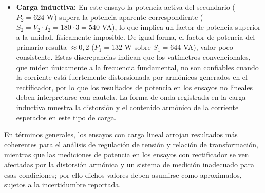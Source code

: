 \begin{itemize}
    \item \textbf{Carga inductiva:} En este ensayo la potencia activa del secundario ($P_2 = 624$ W) supera la potencia aparente correspondiente ($S_2 = V_2 \cdot I_2 = 180 \cdot 3 = 540$ VA), lo que implica un factor de potencia superior a la unidad, físicamente imposible. De igual forma, el factor de potencia del primario resulta $\approx 0,2$ ($P_1 = 132$ W sobre $S_1 = 644$ VA), valor poco consistente. Estas discrepancias indican que los vatímetros convencionales, que miden únicamente a la frecuencia fundamental, no son confiables cuando la corriente está fuertemente distorsionada por armónicos generados en el rectificador, por lo que los resultados de potencia en los ensayos no lineales deben interpretarse con cautela. La forma de onda registrada en la carga inductiva muestra la distorsión y el contenido armónico de la corriente esperados en este tipo de carga.
\end{itemize}

En términos generales, los ensayos con carga lineal arrojan resultados más coherentes para el análisis de regulación de tensión y relación de transformación, mientras que las mediciones de potencia en los ensayos con rectificador se ven afectadas por la distorsión armónica y un sistema de medición inadecuado para esas condiciones; por ello dichos valores deben asumirse como aproximados, sujetos a la incertidumbre reportada.
